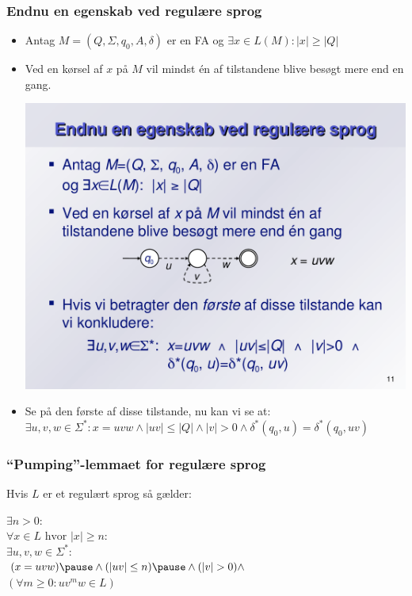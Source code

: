 \begin{frame}
\frametitle{Endnu en egenskab ved regulære sprog}
\begin{itemize}[<+->]
\item Antag $M=(Q, \Sigma, q_0, A, \delta)$ er en FA og $\exists x\in L(M): |x| \geq |Q|$
\item Ved en kørsel af $x$ på $M$ vil mindst én af tilstandene blive
  besøgt mere end en gang.
    \begin{center}
    \includegraphics[scale=.40]{images/pumping}
    \end{center}
\item Se på den første af disse tilstande, nu kan vi se at:
  $\exists u,v,w\in \Sigma^*: x=uvw \wedge |uv| \leq |Q| \wedge |v|>0 \wedge
  \delta^*(q_0,u)=\delta^*(q_0,uv)$
\end{itemize}
\end{frame}

\begin{frame}
\frametitle{``Pumping''-lemmaet for regulære sprog}
Hvis $L$ er et regulært sprog så gælder:

\hspace{1cm}$\exists n>0:$\\
\pause
\hspace{2cm}$\forall x\in L \text{ hvor } |x| \geq n:$\\
\pause
\hspace{3cm}$\exists u,v,w\in \Sigma^*:$\\
\pause
\hspace{4cm}$(x = uvw) \pause \wedge (|uv|\leq n) \pause \wedge (|v| > 0) \wedge$\\
\pause
\hspace{4cm}$(\forall m\geq 0: uv^mw\in L)$\\
\pause
\end{frame}

